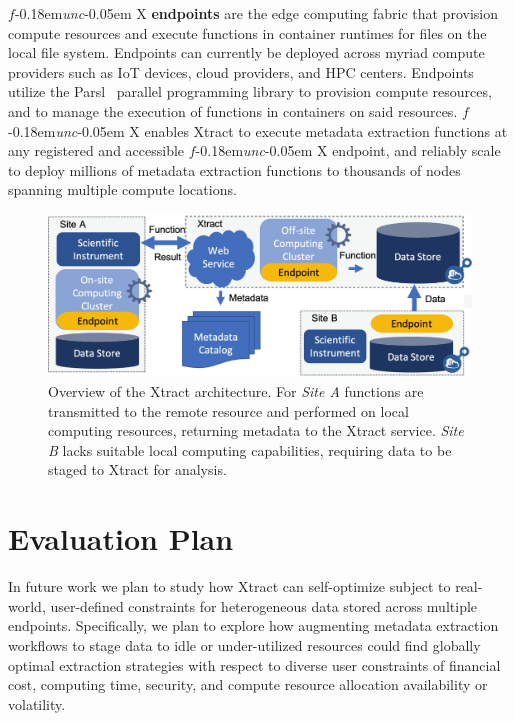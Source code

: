 \documentclass[sigconf, 9pt]{acmart}
\newcommand{\name}{Xtract}
\newcommand{\funcx}{$f$\kern-0.18em\emph{unc}\kern-0.05em X}
\begin{document}
\funcx{} \textbf{endpoints} are the edge computing fabric that provision compute resources and execute functions in container runtimes for files on the local file system.
 Endpoints can currently be deployed across myriad compute providers such as IoT devices, cloud providers, and HPC centers.  
Endpoints utilize the Parsl~\cite{babuji2019parsl} parallel programming library to 
provision compute resources, and to manage the execution of functions in containers on said resources. \funcx{} enables 
\name{} to execute metadata extraction functions at any registered and accessible \funcx{} endpoint, and reliably
scale to deploy millions of metadata extraction functions to thousands of nodes spanning multiple compute locations. 

\begin{figure}[t]
	\centering
	\includegraphics[scale=0.17]{figs/updated-fig.png}
	\caption{Overview of the \name{} architecture. For \textit{Site A} functions are transmitted to the remote resource and performed on local computing resources, returning metadata to the \name{} service. \textit{Site B} lacks suitable local
	computing capabilities, requiring data to be staged to \name{} for analysis.}
	\label{fig:arch}
\end{figure}


\section{Evaluation Plan}
\label{sec:eval}

In future work we plan to study how \name{} can self-optimize subject to real-world, user-defined constraints for heterogeneous data stored across multiple 
endpoints.  Specifically, we plan to explore how augmenting metadata extraction workflows to stage data to idle or under-utilized resources could 
find globally optimal extraction strategies with respect to diverse user constraints of financial cost, computing time, security, and compute resource allocation 
availability or volatility.
\end{document}
